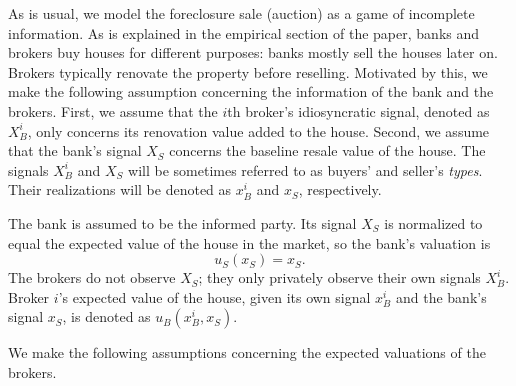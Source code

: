 \documentclass[11pt,twopage]{article}
\begin{document}
As is usual, we model the foreclosure sale (auction) as a game of
incomplete information. 
As is explained in the empirical section of the paper, banks and brokers buy houses for different purposes: banks mostly sell the houses later on. Brokers typically renovate the property before reselling. Motivated by this, we make the following assumption concerning the information of the bank and the brokers. First, we assume that the $i$th broker's idiosyncratic signal, denoted as $X_B^i$, only concerns its renovation value added to the house. Second, we assume that the bank's signal $X_S$ concerns the baseline resale value of the house. The signals $X_B^i$ and $X_S$ will be sometimes referred
to as buyers' and seller's \emph{types}. Their realizations will be denoted as $x_B^i$ and $x_S$, respectively. 

The bank is
assumed to be the informed party. Its signal $X_S$ is normalized to
equal the expected value of the house in the market, so the bank's
valuation is 
\[ 
u_S(x_S) = x_S .
\] 
The brokers do not observe 
$X_S$; they only privately observe their own signals $X_B^i$. Broker $i$'s expected value of the house, given its own signal $x_B^i$ and the bank's signal $x_S$, is denoted as $ u_B(x_B^i,x_S).$


%
%



We make the following assumptions concerning the expected valuations of the brokers.
\end{document}
